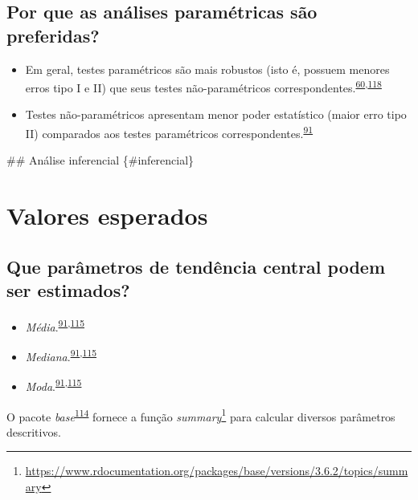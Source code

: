 \documentclass[
  a4paper,
]{book}
\renewcommand{\href}[2]{#2\footnote{\url{#1}}}
\newenvironment{infobox}[1]
  {
  \begin{itemize}
  \renewcommand{\labelitemi}{
    \raisebox{-.7\height}[0pt][0pt]{
      {\setkeys{Gin}{width=3em,keepaspectratio}
        \texttt{[image: \#1]}}
    }
  }
  \setlength{\fboxsep}{1em}
  \begin{blackbox}
  \item
  }
  {
  \end{blackbox}
  \end{itemize}
  }
\begin{document}
\hypertarget{por-que-as-anuxe1lises-paramuxe9tricas-suxe3o-preferidas}{%
\subsection{Por que as análises paramétricas são preferidas?}\label{por-que-as-anuxe1lises-paramuxe9tricas-suxe3o-preferidas}}

\begin{itemize}
\item
  Em geral, testes paramétricos são mais robustos (isto é, possuem menores erros tipo I e II) que seus testes não-paramétricos correspondentes.\textsuperscript{\protect\hyperlink{ref-vetter2017}{60},\protect\hyperlink{ref-greenhalgh1997}{118}}
\item
  Testes não-paramétricos apresentam menor poder estatístico (maior erro tipo II) comparados aos testes paramétricos correspondentes.\textsuperscript{\protect\hyperlink{ref-Ali2016}{91}}
\end{itemize}

\#\# Análise inferencial \{\#inferencial\}

\hypertarget{valores-esperados}{%
\section{Valores esperados}\label{valores-esperados}}

\hypertarget{que-paruxe2metros-de-tenduxeancia-central-podem-ser-estimados}{%
\subsection{Que parâmetros de tendência central podem ser estimados?}\label{que-paruxe2metros-de-tenduxeancia-central-podem-ser-estimados}}

\begin{itemize}
\item
  \emph{Média}.\textsuperscript{\protect\hyperlink{ref-Ali2016}{91},\protect\hyperlink{ref-kanji2006}{115}}
\item
  \emph{Mediana}.\textsuperscript{\protect\hyperlink{ref-Ali2016}{91},\protect\hyperlink{ref-kanji2006}{115}}
\item
  \emph{Moda}.\textsuperscript{\protect\hyperlink{ref-Ali2016}{91},\protect\hyperlink{ref-kanji2006}{115}}
\end{itemize}

\begin{infobox}{images/Rlogo}
O pacote \emph{base}\textsuperscript{\protect\hyperlink{ref-base-6}{114}} fornece a função \href{https://www.rdocumentation.org/packages/base/versions/3.6.2/topics/summary}{\emph{summary}} para calcular diversos parâmetros descritivos.

\end{infobox}
\end{document}
